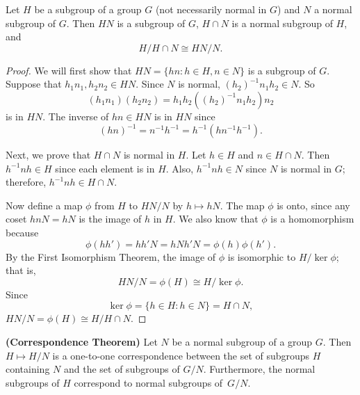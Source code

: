  
\begin{theorem}\label{homomorph:theorem:2nd_isomorph}
Let  $H$ be a subgroup of a group $G$ (not necessarily normal in $G$)
and $N$ a normal subgroup of $G$.  Then $HN$ is a subgroup of $G$,
$H \cap N$ is a normal subgroup of $H$, and 
\[
H / H \cap N \cong HN /N.
\]
\end{theorem}
 
 
\begin{proof}
We will first show that $HN = \{ hn : h \in H, n \in N \}$ is a
subgroup of $G$.  Suppose that  $h_1 n_1, h_2 n_2 \in HN$. Since 
$N$ is normal, $(h_2)^{-1} n_1 h_2 \in N$. So 
\[
(h_1 n_1)(h_2 n_2) = h_1 h_2 ( (h_2)^{-1} n_1 h_2 )n_2
\]
is in $HN$. The inverse of $hn \in HN$ is in $HN$ since
\[
( hn )^{-1} = n^{-1 } h^{-1} = h^{-1} (h n^{-1} h^{-1} ).
\]
 
 
Next, we prove that $H \cap N$ is normal in $H$. Let $h \in H$ and $n
\in H \cap N$. Then $h^{-1} n h \in H$ since each element is in $H$.
Also, $h^{-1} n h \in N$ since $N$ is normal in $G$; therefore,
$h^{-1} n h \in H \cap N$. 
 
 
Now define a map $\phi$ from $H$ to $ HN / N$ by $h \mapsto h N$. The
map $\phi$ is onto, since any coset $h n N = h N$ is the image of $h$
in $H$. We also know that $\phi$ is a homomorphism because 
\[
\phi( h  h')  = h h' N =  h N h' N =  \phi( h ) \phi( h').
\]
By the First Isomorphism Theorem, the image of $\phi$ is isomorphic to
$H / \ker \phi$; that is,
\[
HN/N = \phi(H) \cong H / \ker \phi.
\]
Since
\[
\ker \phi = \{ h \in H : h \in N \} = H \cap N,
\]
$HN/N = \phi(H) \cong H / H \cap N$.
\end{proof}
 
 
\begin{theorem} {\bf (Correspondence Theorem)}\label{CorrespondTheorem}
Let $N$ be a normal subgroup of a group $G$. Then $H \mapsto H/N$
is a one-to-one correspondence between the set of subgroups $H$
containing $N$  and the set of subgroups of $G/N$. Furthermore, the
normal subgroups of $H$ correspond to normal subgroups of~$G/N$. 
\end{theorem}
 
